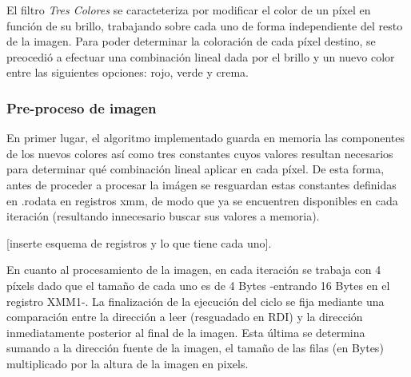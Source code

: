 
El filtro \textit{Tres Colores} se caracteteriza por modificar el color de un píxel en función de su brillo, trabajando sobre cada uno de forma independiente del resto de la imagen. Para poder determinar la coloración de cada píxel destino, se preocedió a efectuar una combinación lineal dada por el brillo y un nuevo color entre las siguientes opciones: rojo, verde y crema.

\subsubsection{Pre-proceso de imagen}

En primer lugar, el algoritmo implementado guarda en memoria las componentes de los nuevos colores así como tres constantes cuyos valores resultan necesarios para determinar qué combinación lineal aplicar en cada píxel. De esta forma, antes de proceder a procesar la imágen se resguardan estas constantes definidas en .rodata en registros xmm, de modo que ya se encuentren disponibles en cada iteración (resultando innecesario buscar sus valores a memoria).

[inserte esquema de registros y lo que tiene cada uno].

En cuanto al procesamiento de la imagen, en cada iteración se trabaja con 4 píxels dado que el tamaño de cada uno es de 4 Bytes -entrando 16 Bytes en el registro XMM1-. La finalización de la ejecución del ciclo se fija mediante una comparación entre la dirección a leer (resguadado en RDI) y la dirección inmediatamente posterior al final de la imagen. Esta última se determina sumando a la dirección fuente de la imagen, el tamaño de las filas (en Bytes) multiplicado por la altura de la imagen en pixels.

